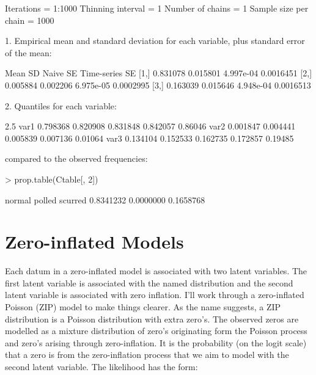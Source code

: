 \documentclass{article}
\begin{document}
\begin{Schunk}
\begin{Soutput}
Iterations = 1:1000
Thinning interval = 1 
Number of chains = 1 
Sample size per chain = 1000 

1. Empirical mean and standard deviation for each variable,
   plus standard error of the mean:

         Mean       SD  Naive SE Time-series SE
[1,] 0.831078 0.015801 4.997e-04      0.0016451
[2,] 0.005884 0.002206 6.975e-05      0.0002995
[3,] 0.163039 0.015646 4.948e-04      0.0016513

2. Quantiles for each variable:

         2.5%
var1 0.798368 0.820908 0.831848 0.842057 0.86046
var2 0.001847 0.004441 0.005839 0.007136 0.01064
var3 0.134104 0.152533 0.162735 0.172857 0.19485
\end{Soutput}
\end{Schunk}

compared to the observed frequencies:

\begin{Schunk}
\begin{Sinput}
> prop.table(Ctable[, 2])
\end{Sinput}
\begin{Soutput}
   normal    polled   scurred 
0.8341232 0.0000000 0.1658768 
\end{Soutput}
\end{Schunk}


\section{Zero-inflated Models}

Each datum in a zero-inflated model is associated with two latent variables. The first latent variable is associated with the named distribution and the second latent variable is associated with zero inflation. I'll work through a zero-inflated Poisson (ZIP) model to make things clearer. As the name suggests, a ZIP distribution is a Poisson distribution with extra zero's. The observed zeros are modelled as a mixture distribution of zero's originating form the Poisson process and zero's arising through zero-inflation. It is the probability (on the logit scale) that a zero is from the zero-inflation process that we aim to model with the second latent variable. The likelihood has the form:
\end{document}
